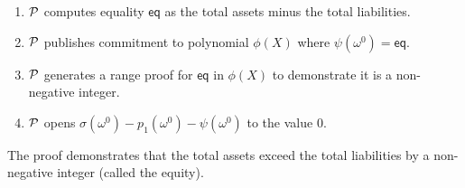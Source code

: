 

\begin{Protocol*}[t!]
\begin{framed}
\footnotesize


\begin{enumerate}
    \item $\mathcal{P}$ computes equality $\mathsf{eq}$ as the total assets minus the total liabilities. 
    \item $\mathcal{P}$ publishes commitment to polynomial $\phi(X)$ where $\psi(\omega^0)=\mathsf{eq}$.
    \item $\mathcal{P}$ generates a range proof for $\mathsf{eq}$ in $\phi(X)$ to demonstrate it is a non-negative integer.
    \item $\mathcal{P}$ opens $\sigma(\omega^0) - p_1(\omega^0) - \psi(\omega^0)$ to the value 0.
\end{enumerate}


\normalsize	
\end{framed}
\caption{The \pos proof demonstrates that the total assets exceed the total liabilities by a non-negative integer (called the equity). \label{alg:pos}}
\end{Protocol*}